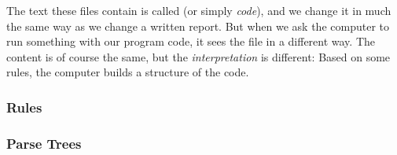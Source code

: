 The text these files contain is called \textsl{} (or simply \textsl{code}), and we change it in much the same way as we change a written report. But when we ask the computer to run something with our program code, it sees the file in a different way. The content is of course the same, but the \textsl{interpretation} is different: Based on some rules, the computer builds a  structure of the code.


\subsubsection{Rules}


\subsubsection{Parse Trees}

